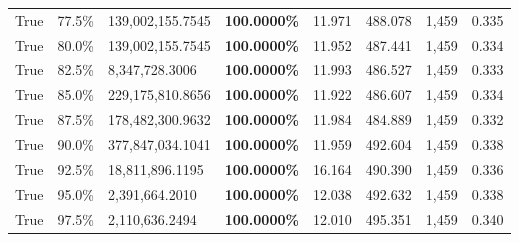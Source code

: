 \begin{table}[H]
\begin{tabular}{lllrllll}
\cline{1-8}
True & 77.5\% & 139,002,155.7545 & \bfseries \color{red} 100.0000\% & 11.971 & 488.078 & 1,459 & 0.335 \\
\cline{1-8}
True & 80.0\% & 139,002,155.7545 & \bfseries \color{red} 100.0000\% & 11.952 & 487.441 & 1,459 & 0.334 \\
\cline{1-8}
True & 82.5\% & 8,347,728.3006 & \bfseries \color{red} 100.0000\% & 11.993 & 486.527 & 1,459 & 0.333 \\
\cline{1-8}
True & 85.0\% & 229,175,810.8656 & \bfseries \color{red} 100.0000\% & 11.922 & 486.607 & 1,459 & 0.334 \\
\cline{1-8}
True & 87.5\% & 178,482,300.9632 & \bfseries \color{red} 100.0000\% & 11.984 & 484.889 & 1,459 & 0.332 \\
\cline{1-8}
True & 90.0\% & 377,847,034.1041 & \bfseries \color{red} 100.0000\% & 11.959 & 492.604 & 1,459 & 0.338 \\
\cline{1-8}
True & 92.5\% & 18,811,896.1195 & \bfseries \color{red} 100.0000\% & 16.164 & 490.390 & 1,459 & 0.336 \\
\cline{1-8}
True & 95.0\% & 2,391,664.2010 & \bfseries \color{red} 100.0000\% & 12.038 & 492.632 & 1,459 & 0.338 \\
\cline{1-8}
True & 97.5\% & 2,110,636.2494 & \bfseries \color{red} 100.0000\% & 12.010 & 495.351 & 1,459 & 0.340 \\
\cline{1-8}
\bottomrule
\end{tabular}
\end{table}
